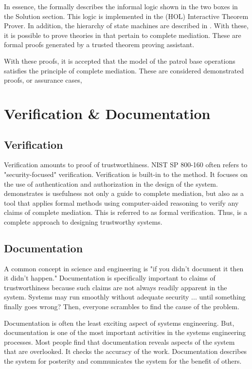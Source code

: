 \documentclass[../../main/main.tex]{subfiles}
\begin{document}
In essence, the  formally describes the informal logic shown in the two boxes in the Solution section.  This logic is implemented in the  (HOL) Interactive Theorem Prover.  In addition, the hierarchy of state machines are described in .  With these, it is possible to prove theories in  that pertain to complete mediation.  These are formal proofs generated by a trusted theorem proving assistant.  

With these proofs, it is accepted that the model of the patrol base operations satisfies the principle of complete mediation.  These are considered demonstrated proofs, or assurance cases, 

\section{Verification \& Documentation}\label{sssec:sseframework}
\subsection{Verification}
Verification amounts to proof of trustworthiness.  NIST SP 800-160 often refers to "security-focused" verification.  Verification is built-in to the  method.  It focuses on the use of authentication and authorization in the design of the system.   demonstrates is usefulness not only a guide to complete mediation, but also as a tool that applies formal methods using computer-aided reasoning to verify any claims of complete mediation. This is referred to as formal verification. Thus,  is a complete approach to designing trustworthy systems.

\subsection{Documentation}
A common concept in science and engineering is "if you didn't document it then it didn't happen."  Documentation is specifically important to claims of trustworthiness because such claims are not always readily apparent in the system. Systems may run smoothly without adequate security ... until something finally goes wrong?  Then, everyone scrambles to find the cause of the problem.

Documentation is often the least exciting aspect of systems engineering. But, documentation is one of the most important activities in the systems engineering processes.  Most people find that documentation reveals aspects of the system that are overlooked.  It checks the accuracy of the work.  Documentation describes the system for posterity and communicates the system for the benefit of others.  
\end{document}
